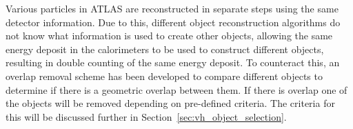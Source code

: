 Various particles in ATLAS are reconstructed in separate steps using the same detector information. Due to this, different object reconstruction algorithms do not know what information is used to create other objects, allowing the same energy deposit in the calorimeters to be used to construct different objects, resulting in double counting of the same energy deposit. To counteract this, an overlap removal scheme has been developed to compare different objects to determine if there is a geometric overlap between them. If there is overlap one of the objects will be removed depending on pre-defined criteria. The criteria for this will be discussed further in Section~\ref{sec:vh_object_selection}.